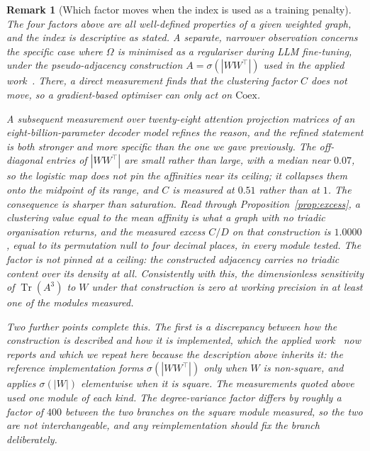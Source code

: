 \documentclass[11pt,a4paper]{article}
\newtheorem{remark}{Remark}
\begin{document}
\begin{remark}[Which factor moves when the index is used as a training penalty]
The four factors above are all well-defined properties of a given weighted
graph, and the index is descriptive as stated. A separate, narrower
observation concerns the \emph{specific} case where $\Omega$ is minimised as a
regulariser during LLM fine-tuning, under the pseudo-adjacency construction
$A=\sigma(|WW^\top|)$ used in the applied work~\cite{acedo2026omegas}. There, a
direct measurement finds that the clustering factor $C$ does not move, so a
gradient-based optimiser can only act on $\mathrm{Coex}$.

A subsequent measurement over twenty-eight attention projection matrices of
an eight-billion-parameter decoder model refines the reason, and the refined
statement is both stronger and more specific than the one we gave
previously. The off-diagonal entries of $|WW^\top|$ are small rather than
large, with a median near $0.07$, so the logistic map does not pin the
affinities near its ceiling; it collapses them onto the midpoint of its
range, and $C$ is measured at $0.51$ rather than at $1$. The consequence is
sharper than saturation. Read through
Proposition~\ref{prop:excess}, a clustering value equal to the mean affinity
is what a graph with no triadic organisation returns, and the measured excess
$C/D$ on that construction is $1.0000$, equal to its permutation null to four
decimal places, in every module tested. The factor is not pinned at a
ceiling: the constructed adjacency carries no triadic content over its
density at all. Consistently with this, the dimensionless sensitivity of
$\operatorname{Tr}(A^3)$ to $W$ under that construction is zero at working
precision in at least one of the modules measured.

Two further points complete this. The first is a discrepancy between how the
construction is described and how it is implemented, which the applied
work~\cite{acedo2026omegas} now reports and which we repeat here because the
description above inherits it: the reference implementation forms
$\sigma(|WW^\top|)$ only when $W$ is non-square, and applies $\sigma(|W|)$
elementwise when it is square. The measurements quoted above used one module
of each kind. The degree-variance factor differs by roughly a factor of $400$
between the two branches on the square module measured, so the two are not
interchangeable, and any reimplementation should fix the branch deliberately.


\end{remark}
\end{document}
